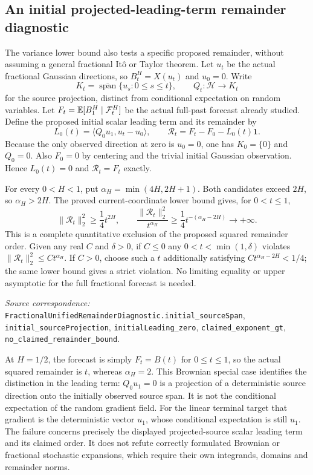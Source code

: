 \documentclass[11pt]{article}
\newcommand{\code}[1]{{\small\nolinkurl{#1}}}
\begin{document}
\subsection*{An initial projected-leading-term remainder diagnostic}
The variance lower bound also tests a specific proposed remainder,
without assuming a general fractional It\^o or Taylor theorem.
Let $u_t$ be the actual fractional Gaussian directions, so
$B_t^H=X(u_t)$ and $u_0=0$. Write
\[
 K_t=\overline{\operatorname{span}}\{u_s:0\leq s\leq t\},
 \qquad Q_t:\mathcal H\to K_t
\]
for the source projection, distinct from conditional expectation
on random variables. Let $F_t=\mathbb E[B_1^H\mid\mathcal F_t^H]$ be the
actual full-past forecast already studied. Define the proposed
initial scalar leading term and its remainder by
\[
 L_0(t)=\langle Q_0u_1,u_t-u_0\rangle,\qquad
 \mathcal R_t=F_t-F_0-L_0(t)\mathbf1.
\]
Because the only observed direction at zero is $u_0=0$, one has
$K_0=\{0\}$ and $Q_0=0$. Also $F_0=0$ by centering and the
trivial initial Gaussian observation. Hence $L_0(t)=0$ and
$\mathcal R_t=F_t$ exactly.

For every $0<H<1$, put $\alpha_H=\min(4H,2H+1)$.
Both candidates exceed $2H$, so $\alpha_H>2H$. The proved
current-coordinate lower bound gives, for $0<t\leq1$,
\[
 \|\mathcal R_t\|_2^2\geq\frac14t^{2H},\qquad
 \frac{\|\mathcal R_t\|_2^2}{t^{\alpha_H}}
       \geq\frac14t^{-(\alpha_H-2H)}\longrightarrow+\infty.
\]
This is a complete quantitative exclusion of the proposed squared
remainder order. Given any real $C$ and $\delta>0$, if $C\leq0$
any $0<t<\min(1,\delta)$ violates
$\|\mathcal R_t\|_2^2\leq Ct^{\alpha_H}$. If $C>0$, choose such a
$t$ additionally satisfying $Ct^{\alpha_H-2H}<1/4$; the same
lower bound gives a strict violation. No limiting equality or
upper asymptotic for the full fractional forecast is needed.
\par\smallskip\begingroup\small\raggedright
\noindent\textit{Source correspondence:}
\code{FractionalUnifiedRemainderDiagnostic.initial_sourceSpan},
\code{initial_sourceProjection}, \code{initialLeading_zero},
\code{claimed_exponent_gt}, \code{no_claimed_remainder_bound}.
\par\endgroup

At $H=1/2$, the forecast is simply $F_t=B(t)$ for $0\leq t\leq1$,
so the actual squared remainder is $t$, whereas $\alpha_H=2$.
This Brownian special case identifies the distinction in the
leading term: $Q_0u_1=0$ is a projection of a deterministic source
direction onto the initially observed source span. It is not the
conditional expectation of the random gradient field. For the
linear terminal target that gradient is the deterministic vector
$u_1$, whose conditional expectation is still $u_1$.
The failure concerns precisely the displayed projected-source
scalar leading term and its claimed order. It does not refute
correctly formulated Brownian or fractional stochastic expansions,
which require their own integrands, domains and remainder norms.
\end{document}
